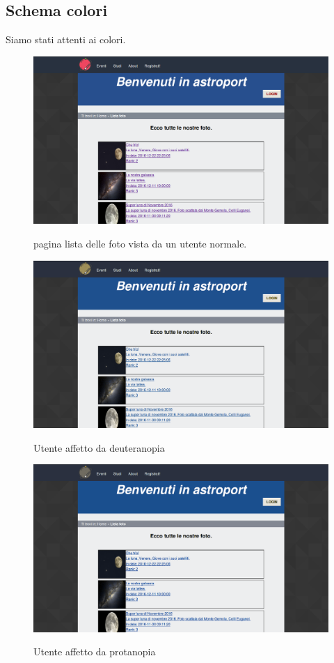 	\subsection{Schema colori}
	Siamo stati attenti ai colori.
	\begin{figure}
	\includegraphics[scale=0.3]{images/test.png}\\[1cm] \caption{pagina lista delle foto vista da un utente normale.}
	\end{figure}
	\begin{figure}
	\includegraphics[scale=0.3]{images/deuteranopia.jpg}\\[1cm] \caption{Utente affetto da deuteranopia}
	\end{figure}
	\begin{figure}
	\includegraphics[scale=0.3]{images/protanopia.jpg}\\[1cm] \caption{Utente affetto da protanopia}
	\end{figure}

